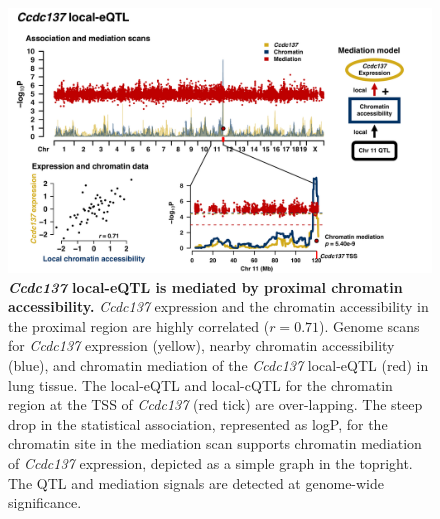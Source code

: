 \documentclass[9pt,twocolumn,twoside]{gsajnl}
\begin{document}
\begin{figure}[h]
\includegraphics[width=\textwidth, trim={0in 0in 0in 0in}, clip]{figs/ccdc137_mediation.pdf}
\caption{\textbf{\textit{Ccdc137} local-eQTL is mediated by proximal chromatin accessibility.} \textit{Ccdc137} expression and the chromatin accessibility in the proximal region are highly correlated ($r = 0.71$). Genome scans for \textit{Ccdc137} expression (yellow), nearby chromatin accessibility (blue), and chromatin mediation of the \textit{Ccdc137} local-eQTL (red) in lung tissue. The local-eQTL and local-cQTL for the chromatin region at the TSS of \textit{Ccdc137} (red tick) are over-lapping. The steep drop in the statistical association, represented as logP, for the chromatin site in the mediation scan supports chromatin mediation of \textit{Ccdc137} expression, depicted as a simple graph in the topright. The QTL and mediation signals are detected at genome-wide significance. \label{fig:ccdc137_mediation}}
\end{figure}
\end{document}
